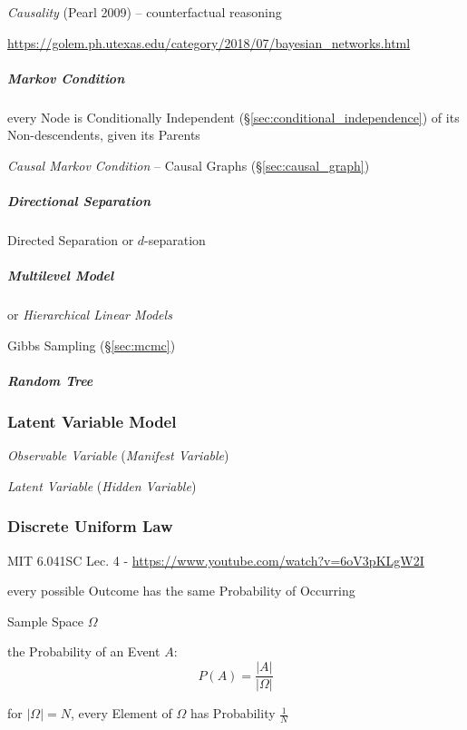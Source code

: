 \emph{Causality} (Pearl 2009) -- counterfactual reasoning

\url{https://golem.ph.utexas.edu/category/2018/07/bayesian_networks.html}



\subparagraph{Markov Condition}\label{sec:markov_condition}\hfill

every Node is Conditionally Independent (\S\ref{sec:conditional_independence})
of its Non-descendents, given its Parents

\emph{Causal Markov Condition}
--
Causal Graphs (\S\ref{sec:causal_graph})



\subparagraph{Directional Separation}\label{sec:directional_separation}\hfill

Directed Separation or $d$-separation



\subparagraph{Multilevel Model}\label{sec:multilevel_model}\hfill

or \emph{Hierarchical Linear Models}

Gibbs Sampling (\S\ref{sec:mcmc})



\subparagraph{Random Tree}\label{sec:random_tree}\hfill



\subsubsection{Latent Variable Model}\label{sec:latent_variable_model}

\emph{Observable Variable} (\emph{Manifest Variable})

\emph{Latent Variable} (\emph{Hidden Variable})



\subsubsection{Discrete Uniform Law}\label{sec:discrete_uniform_law}

MIT 6.041SC Lec. 4 - \url{https://www.youtube.com/watch?v=6oV3pKLgW2I}

every possible Outcome has the same Probability of Occurring

Sample Space $\Omega$

the Probability of an Event $A$:
\[
  P(A) = \frac{|A|}{|\Omega|}
\]

for $|\Omega| = N$, every Element of $\Omega$ has Probability $\frac{1}{N}$

